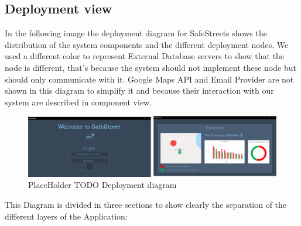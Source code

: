 \subsection{Deployment view}
In the following image the deployment diagram for SafeStreets shows the distribution of the system components and the different deployment nodes. We used a different color to represent External Database servers to show that the node is different, that's because the system should not implement these node but should only communicate with it.
Google Maps API and Email Provider are not shown in this diagram to simplify it and because their interaction with our system are described in component view.
\newline
\begin{figure}[h]
\centering
\includegraphics[width=\textwidth]{Images/desktop_common_interface.png}
\caption{\label{fig:ComWI}PlaceHolder TODO Deployment diagram}
\end{figure}
This Diagram is divided in three sections to show clearly the separation of the different layers of the Application:
